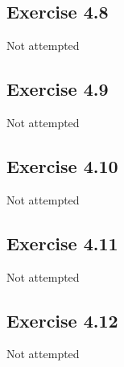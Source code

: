 \subsection{Exercise 4.8}
Not attempted

\subsection{Exercise 4.9}
Not attempted

\subsection{Exercise 4.10}
Not attempted

\subsection{Exercise 4.11}
Not attempted

\subsection{Exercise 4.12}
Not attempted

